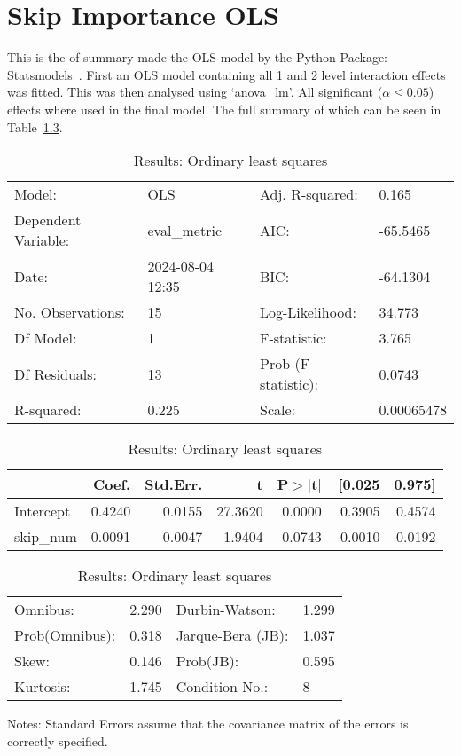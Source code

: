 \chapter{Skip Importance OLS}
\label{appendix:skip_importance_full}
This is the of summary made the OLS model by the Python Package: Statsmodels~\cite{josef_perktold_2024_10984387}. First an OLS model containing all 1 and 2 level interaction effects was fitted. This was then analysed using `anova\_lm'. All significant ($\alpha\le0.05$) effects where used in the final model. The full summary of which can be seen in Table~\ref{tab:skip_importance_full_ols}.

\begin{table}[ht]
\caption{Results: Ordinary least squares}
\label{tab:skip_importance_full_ols}
\begin{center}
\begin{tabular}{llll}
\hline
Model:              & OLS              & Adj. R-squared:     & 0.165       \\
Dependent Variable: & eval\_metric     & AIC:                & -65.5465    \\
Date:               & 2024-08-04 12:35 & BIC:                & -64.1304    \\
No. Observations:   & 15               & Log-Likelihood:     & 34.773      \\
Df Model:           & 1                & F-statistic:        & 3.765       \\
Df Residuals:       & 13               & Prob (F-statistic): & 0.0743      \\
R-squared:          & 0.225            & Scale:              & 0.00065478  \\
\hline
\end{tabular}
\end{center}

\begin{center}
\begin{tabular}{lrrrrrr}
\hline
          &  Coef. & Std.Err. &       t & P$> |$t$|$ &  [0.025 & 0.975]  \\
\hline
Intercept & 0.4240 &   0.0155 & 27.3620 &      0.0000 &  0.3905 & 0.4574  \\
skip\_num & 0.0091 &   0.0047 &  1.9404 &      0.0743 & -0.0010 & 0.0192  \\
\hline
\end{tabular}
\end{center}

\begin{center}
\begin{tabular}{llll}
\hline
Omnibus:       & 2.290 & Durbin-Watson:    & 1.299  \\
Prob(Omnibus): & 0.318 & Jarque-Bera (JB): & 1.037  \\
Skew:          & 0.146 & Prob(JB):         & 0.595  \\
Kurtosis:      & 1.745 & Condition No.:    & 8      \\
\hline
\end{tabular}
\end{center}
\end{table}
\bigskip
Notes: \newline 
[1] Standard Errors assume that the covariance matrix of the errors is correctly specified.